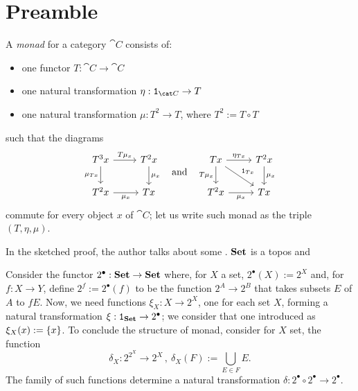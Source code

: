 
\section{Preamble}


\begin{definition}
A {\em monad} for a category \(\cat C\) consists of:
\begin{itemize}
\item one functor \(T :  \cat C \to \cat C\)
\item one natural transformation \(\eta : \id_{\cat C} \to T\)
\item one natural transformation \(\mu : T^2 \to T\), where \(T^2 := T \circ T\)
\end{itemize}
such that the diagrams
\[\begin{tikzcd}
T^3 x \ar["{T\mu_x}", r] \ar["{\mu_{T x}}", d, swap] & T^2 x \ar["{\mu_x}", d] \\
T^2 x \ar["{\mu_x}", r, swap] & T x
\end{tikzcd} \quad\text{and}\quad \begin{tikzcd}
T x \ar["{\eta_{T x}}", r] \ar["{\id_{T x}}", dr] \ar["{T\mu_x}", d, swap] & T^2 x \ar["{\mu_x}", d] \\
T^2 x \ar["{\mu_x}", r, swap] & T x
\end{tikzcd}\]
commute for every object \(x\) of \(\cat C\); let us write such monad as the triple \((T, \eta, \mu)\).
\end{definition}

In the sketched proof, the author talks about some . \(\mathbf{Set}\) is a topos and

\begin{sandbox}
Consider the functor \(2^\bullet : \mathbf{Set} \to \mathbf{Set}\) where, for \(X\) a set, \(2^\bullet(X) := 2^X\) and, for \(f : X \to Y\), define \(2^f := 2^\bullet(f)\)  to be the function \(2^A \to 2^B\) that takes subsets \(E\) of \(A\) to \(fE\).\newline
Now, we need functions \(\xi_X : X \to 2^X\), one for each set \(X\), forming a natural transformation \(\xi : \operatorname{\mathtt 1}_{\mathbf{Set}} \to 2^\bullet\); we consider that one introduced as \(\xi_X (x) := \left\{x\right\}\).\newline
To conclude the structure of monad, consider for \(X\) set, the function
\[\delta_X : 2^{2^X} \to 2^X\,, \ \delta_X (F) := \bigcup_{E \in F} E .\]
The family of such functions determine a natural transformation \(\delta : 2^\bullet \circ 2^\bullet \to 2^\bullet\).
\end{sandbox}

